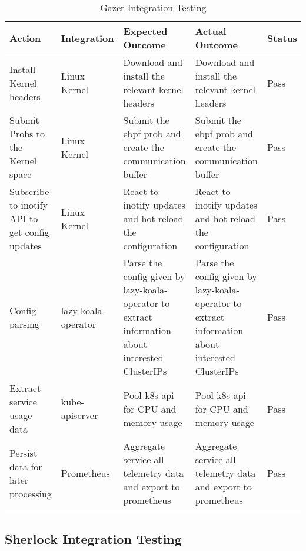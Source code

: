 \begin{longtable}{|p{30mm}|p{21mm}|p{40mm}|p{40mm}|p{10mm}|}
    \hline
    \textbf{Action} &
      \textbf{Integration} &
      \textbf{Expected Outcome} &
      \textbf{Actual Outcome} &
      \textbf{Status} \\ \hline
    Install Kernel headers &
      Linux Kernel &
      Download and install the relevant kernel headers &
      Download and install the relevant kernel headers &
      Pass \\ \hline
    Submit Probs to the Kernel space &
      Linux Kernel &
      Submit the \ac{ebpf} prob and create the communication buffer &
      Submit the \ac{ebpf} prob and create the communication buffer &
      Pass \\ \hline
    Subscribe to inotify API to get config updates &
      Linux Kernel &
      React to inotify updates and hot reload the configuration &
      React to inotify updates and hot reload the configuration &
      Pass \\ \hline
    Config parsing &
      \ac{lazy-koala-operator} &
      Parse the config given by \ac{lazy-koala-operator} to extract information about interested ClusterIPs &
      Parse the config given by \ac{lazy-koala-operator} to extract information about interested ClusterIPs &
      Pass \\ \hline
    Extract service usage data &
      kube-apiserver &
      Pool k8s-api for CPU and memory usage &
      Pool k8s-api for CPU and memory usage &
      Pass \\ \hline
    Persist data for later processing &
      Prometheus &
      Aggregate service all telemetry data and export to prometheus &
      Aggregate service all telemetry data and export to prometheus &
      Pass \\ \hline
    \caption{Gazer Integration Testing}
\end{longtable}


\subsection{Sherlock Integration Testing}

